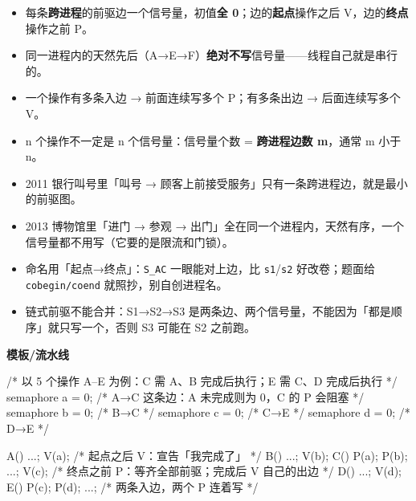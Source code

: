 \documentclass[10pt,a4paper]{ctexart}
\begin{document}
\begin{itemize}

\item 每条\textbf{跨进程}的前驱边一个信号量，初值\textbf{全 0}；边的\textbf{起点}操作之后 V，边的\textbf{终点}操作之前 P。

\item 同一进程内的天然先后（A→E→F）\textbf{绝对不写}信号量——线程自己就是串行的。

\item 一个操作有多条入边 → 前面连续写多个 P；有多条出边 → 后面连续写多个 V。

\item n 个操作不一定是 n 个信号量：信号量个数 = \textbf{跨进程边数 m}，通常 m 小于 n。

\item 2011 银行叫号里「叫号 → 顾客上前接受服务」只有一条跨进程边，就是最小的前驱图。

\item 2013 博物馆里「进门 → 参观 → 出门」全在同一个进程内，天然有序，一个信号量都不用写（它要的是限流和门锁）。

\item 命名用「起点→终点」：\texttt{S\_AC} 一眼能对上边，比 \texttt{s1}/\texttt{s2} 好改卷；题面给 \texttt{cobegin/coend} 就照抄，别自创进程名。

\item 链式前驱不能合并：S1→S2→S3 是两条边、两个信号量，不能因为「都是顺序」就只写一个，否则 S3 可能在 S2 之前跑。

\end{itemize}

\textbf{模板/流水线}

\begin{codebox}
/* 以 5 个操作 A–E 为例：C 需 A、B 完成后执行；E 需 C、D 完成后执行 */
semaphore a = 0;      /* A→C 这条边：A 未完成则为 0，C 的 P 会阻塞 */
semaphore b = 0;      /* B→C */
semaphore c = 0;      /* C→E */
semaphore d = 0;      /* D→E */

A() { ...; V(a); }                    /* 起点之后 V：宣告「我完成了」 */
B() { ...; V(b); }
C() { P(a); P(b); ...; V(c); }        /* 终点之前 P：等齐全部前驱；完成后 V 自己的出边 */
D() { ...; V(d); }
E() { P(c); P(d); ...; }              /* 两条入边，两个 P 连着写 */
\end{codebox}

\end{document}
